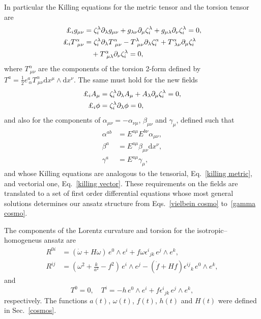 \documentclass[aps,prd,12pt,superscriptaddress,showpacs,showkeys,reprint,nofootinbib]{revtex4-1}
\begin{document}
In particular the Killing equations for the metric tensor and the torsion tensor are
\begin{align}
  \label{killing metric}
  \text{\textsterling}_i g_{\mu\nu}&=\zeta^\lambda_i\partial_\lambda g_{\mu\nu} + g_{\lambda\nu}\partial_\mu\zeta^\lambda_i  + g_{\mu\lambda}\partial_\nu\zeta^\lambda_i = 0,
  \\
  \text{\textsterling}_i T^\alpha_{\ \mu\nu}&=\zeta^\lambda_i\partial_\lambda T^\alpha_{\ \mu\nu} - T^\lambda_{\ \mu\nu} \partial_\lambda \zeta^\alpha_i + T^\alpha_{\ \lambda\nu} \partial_\mu\zeta^\lambda_i  \notag \\
  &\quad + T^\alpha_{\ \mu\lambda} \partial_\nu\zeta^\lambda_i = 0,
\end{align}
where $T^\alpha_{\ \mu\nu}$ are the components of the torsion 2-form defined by $T^a=\frac{1}{2}e^a_{\ \alpha}T^\alpha_{\ \mu\nu}\mbox{d}x^\mu\wedge\mbox{d}x^\nu$. The same must hold for the new fields
\begin{align}
  \label{killing vector}
  \text{\textsterling}_i A_\mu&=\zeta^\lambda_i\partial_\lambda A_\mu + A_\lambda \partial_\mu\zeta^\lambda_i = 0,\\
  \text{\textsterling}_i \phi &=\zeta^\lambda_i\partial_\lambda\phi=0,
\end{align}
and also for the components of $\alpha_{\mu\nu}=-\alpha_{\nu\mu}$, $\beta_{\mu\nu}$ and $\gamma_\mu$, defined such that
\begin{align*}
  \alpha^{ab}&=E^{a\mu}E^{b\nu}\alpha_{\mu\nu},\\
  \beta^a&=E^{a\mu}\beta_{\mu\nu}\mbox{d}x^\nu,\\
  \gamma^a&=E^{a\mu}\gamma_\mu,
\end{align*} 
and whose Killing equations are analogous to the tensorial, Eq.~\eqref{killing metric}, and vectorial one, Eq.~\eqref{killing vector}. These requirements on the fields are translated to a set of first order differential equations whose most general solutions determines our ansatz structure from Eqs.~\eqref{vielbein cosmo} to~\eqref{gamma cosmo}. 

The components of the Lorentz curvature and torsion for the isotropic--homogeneus ansatz are 
\begin{align*}
  R^{0i}&=\left(\dot{\omega}+H\omega\right) \, e^0\wedge e^i+f\omega\epsilon^i{}_{jk} \, e^j\wedge e^k,\\
  R^{ij}&=\left(\omega^2+\tfrac{k}{a^2}-f^2\right) \, e^i\wedge e^j
  -\left(\dot{f}+Hf\right)\epsilon^{ij}{}_{k} \, e^0\wedge e^k,
\end{align*}
and 
\begin{equation}\label{homotorsion}
  T^0=0,\quad T^i=-h \, e^0\wedge e^i+f\epsilon^i{}_{jk} \, e^j\wedge e^k,
\end{equation}
respectively. The functions $a(t)$, $\omega(t)$, $f(t)$, $h(t)$ and $H(t)$ were defined in Sec.~\ref{cosmos}.
\end{document}
